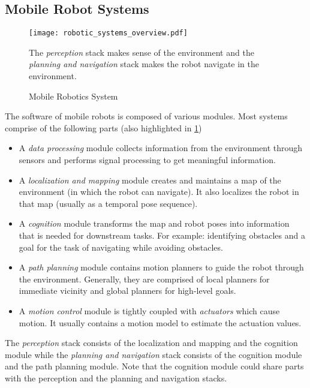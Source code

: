 \subsection{Mobile Robot Systems}
\label{subsec:intro-mobile-robotics}

\begin{figure}
    \centering
    \texttt{[image: robotic\_systems\_overview.pdf]}
    \caption{Mobile Robotics System}
    \small
        The \emph{perception} stack makes sense of the environment and
        the \emph{planning and navigation} stack makes the robot
        navigate in the environment.
    \label{fig:mobile_robot_system}
\end{figure}

The software of mobile robots is composed of various modules. Most
systems comprise of the following parts (also highlighted in
\cref{fig:mobile_robot_system})

\begin{itemize}
    \item A \emph{data processing} module collects information from
        the environment through sensors and performs signal processing
        to get meaningful information.
    \item A \emph{localization and mapping} module creates and
        maintains a map of the environment (in which the robot can
        navigate). It also localizes the robot in that map (usually as
        a temporal pose sequence).
    \item A \emph{cognition} module transforms the map and robot poses
        into information that is needed for downstream tasks. For
        example: identifying obstacles and a goal for the task of
        navigating while avoiding obstacles.
    \item A \emph{path planning} module contains motion planners to
        guide the robot through the environment. Generally, they are
        comprised of local planners for immediate vicinity and global
        planners for high-level goals.
    \item A \emph{motion control} module is tightly coupled with
        \emph{actuators} which cause motion. It usually contains a
        motion model to estimate the actuation values.
\end{itemize}

The \emph{perception} stack consists of the localization and mapping
and the cognition module while the \emph{planning and navigation}
stack consists of the cognition module and the path planning module.
Note that the cognition module could share parts with the perception
and the planning and navigation stacks.

